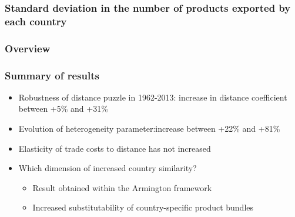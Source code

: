 \documentclass{beamer}
\begin{document}
\begin{frame}[plain]\frametitle{Standard deviation in the number of products exported by each country }
\begin{figure}[h!]
	\begin{center}
		\setlength{\fboxrule}{1pt} %
		\setlength{\fboxsep}{.1in} %
	\end{center}
\end{figure}
\end{frame}

\begin{frame}
	\frametitle{Overview} 
	\tableofcontents
\end{frame}


\begin{frame}[plain]\frametitle{Summary of results}
\vspace{0.3cm}
\begin{itemize}
\item Robustness of distance puzzle in 1962-2013: increase in distance coefficient between +5\% and +31\%
\vspace{0.3cm}
\item Evolution of heterogeneity parameter:increase between +22\% and +81\%
\vspace{0.3cm}
\item Elasticity of trade costs to distance has not increased
\vspace{0.3cm}
\item Which dimension of increased country similarity? 
	\begin{itemize}
	\item Result obtained within the Armington framework 
	\item Increased substitutability of country-specific product bundles 
	\end{itemize}
\end{itemize}

\end{frame}
\end{document}
